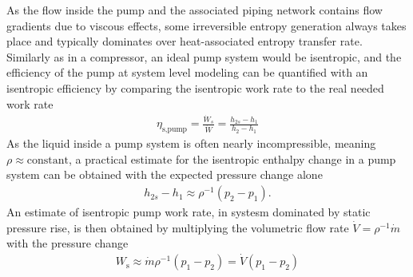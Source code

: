 As the flow inside the pump and the associated piping network contains flow gradients due to viscous effects, some irreversible entropy generation always takes place and typically dominates over heat-associated entropy transfer rate. Similarly as in a compressor, an ideal pump system would be isentropic, and the efficiency of the pump at system level modeling can be quantified with an isentropic efficiency by comparing the isentropic work rate to the real needed work rate
\begin{align}
    \eta_\text{s,pump}=\frac{\dot{W}_{s}}{\dot{W}}=\frac{h_{2s}-h_1}{h_2-h_1}
\end{align}
As the liquid inside a pump system is often nearly incompressible, meaning $\rho\approx\text{constant}$, a practical estimate for the isentropic enthalpy change in a pump system can be obtained with the expected pressure change alone
\begin{align}
    h_{2s}-h_1\approx \rho^{-1}(p_2-p_1).
\end{align}
An estimate of isentropic pump work rate, in systesm dominated by static pressure rise, is then obtained by multiplying the volumetric flow rate $\dot{V}=\rho^{-1}\dot{m}$ with the pressure change
\begin{align}
    W_\text{s}\approx \dot{m}\rho^{-1}(p_1-p_2)=\dot{V}(p_1-p_2)
\end{align}
